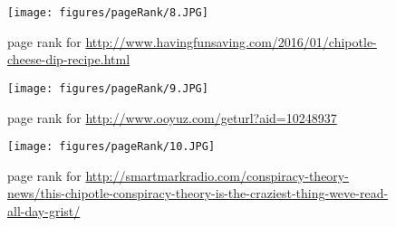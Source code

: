 \begin{figure}[h!]
\begin{center}
\hspace*{-1.5in}
\texttt{[image: figures/pageRank/8.JPG]}
\caption{page rank for {\url{http://www.havingfunsaving.com/2016/01/chipotle-cheese-dip-recipe.html}}}
\label{fig:q3fig8}
\end{center}
\end{figure}

\begin{figure}[h!]
\begin{center}
\hspace*{-1.5in}
\texttt{[image: figures/pageRank/9.JPG]}
\caption{page rank for {\url{http://www.ooyuz.com/geturl?aid=10248937}}}
\label{fig:q3fig9}
\end{center}
\end{figure}

\begin{figure}[h!]
\begin{center}
\hspace*{-1.5in}
\texttt{[image: figures/pageRank/10.JPG]}
\caption{page rank for {\url{http://smartmarkradio.com/conspiracy-theory-news/this-chipotle-conspiracy-theory-is-the-craziest-thing-weve-read-all-day-grist/}}}
\label{fig:q3fig10}
\end{center}
\end{figure}